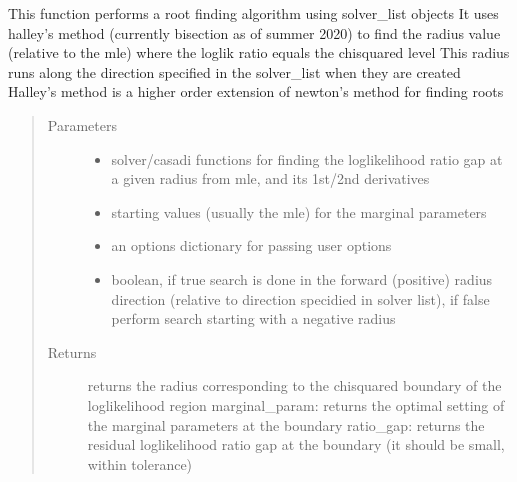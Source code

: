 \documentclass[letterpaper,10pt,english]{sphinxmanual}
\begin{document}
\begin{fulllineitems}
\begin{fulllineitems}
\label{\detokenize{nloed:nloed.model.Model.__logliksearch}}
This function performs a root finding algorithm using solver\_list objects
It uses halley’s method (currently bisection as of summer 2020) to find the radius value (relative to the mle) where the loglik ratio equals the chi\sphinxhyphen{}squared level
This radius runs along the direction specified in the solver\_list when they are created
Halley’s method is a higher order extension of newton’s method for finding roots
\begin{quote}\begin{description}
\item[{Parameters}] \leavevmode\begin{itemize}
\item {} 
 \textendash{} solver/casadi functions for finding the loglikelihood ratio gap at a given radius from mle,  and its 1st/2nd derivatives

\item {} 
 \textendash{} starting values (usually the mle) for the marginal parameters

\item {} 
 \textendash{} an options dictionary for passing user options

\item {} 
 \textendash{} boolean,  if true search is done in the forward (positive) radius direction (relative to direction specidied in solver list),  if false perform search starting with a negative radius

\end{itemize}

\item[{Returns}] \leavevmode
returns the radius corresponding to the chi\sphinxhyphen{}squared boundary of the loglikelihood region
marginal\_param: returns the optimal setting of the marginal parameters at the boundary
ratio\_gap: returns the residual loglikelihood ratio gap at the boundary (it should be small,  within tolerance)


\end{description}
\end{quote}
\end{fulllineitems}
\end{fulllineitems}
\end{document}
